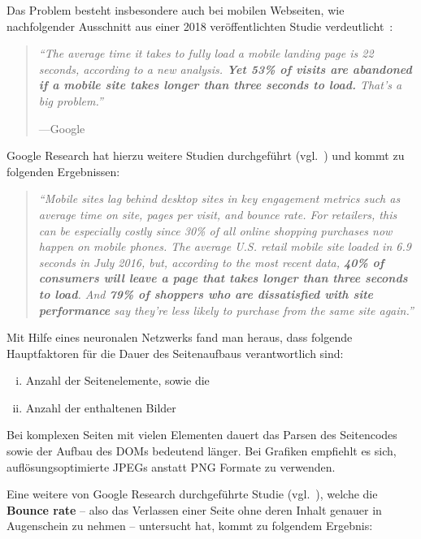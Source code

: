 \documentclass[a4paper, justified, notoc]{tufte-handout} %
\begin{document}
Das Problem besteht insbesondere auch bei mobilen Webseiten, wie nachfolgender Ausschnitt aus einer 2018 veröffentlichten Studie verdeutlicht~\citep{hobo:2018}:
\begin{quote}
	\emph{``The average time it takes to fully load a mobile landing page is 22 seconds, according to a new analysis. \textbf{Yet 53\% of visits are abandoned if a mobile site takes longer than three seconds to load.} That’s a big problem.''}\begin{flushright}\vspace{-1em}---Google \end{flushright}
\end{quote}

Google Research hat hierzu weitere Studien durchgeführt (vgl.~\citep{an:2016}) und kommt zu folgenden Ergebnissen:
\begin{quote}
	\emph{``Mobile sites lag behind desktop sites in key engagement metrics such as average time on site, pages per visit, and bounce rate. For retailers, this can be especially costly since 30\% of all online shopping purchases now happen on mobile phones. The average U.S. retail mobile site loaded in 6.9 seconds in July 2016, but, according to the most recent data, \textbf{40\% of consumers will leave a page that takes longer than three seconds to load}. And \textbf{79\% of shoppers who are dissatisfied with site performance} say they're less likely to purchase from the same site again.''}
\end{quote}

Mit Hilfe eines neuronalen Netzwerks fand man heraus, dass folgende Hauptfaktoren für die Dauer des Seitenaufbaus verantwortlich sind: 
\begin{enumerate}[(i)]
	\item Anzahl der Seitenelemente, sowie die
	\item Anzahl der enthaltenen Bilder
\end{enumerate} 
Bei komplexen Seiten mit vielen Elementen dauert das Parsen des Seitencodes sowie der Aufbau des DOMs bedeutend länger. Bei Grafiken empfiehlt es sich, auflösungsoptimierte JPEGs anstatt PNG Formate zu verwenden.

Eine weitere von Google Research durchgeführte Studie (vgl.~\citep{google:2017}), welche die \textbf{Bounce rate} -- also das Verlassen einer Seite ohne deren Inhalt genauer in Augenschein zu nehmen -- untersucht hat, kommt zu folgendem Ergebnis:
\end{document}
